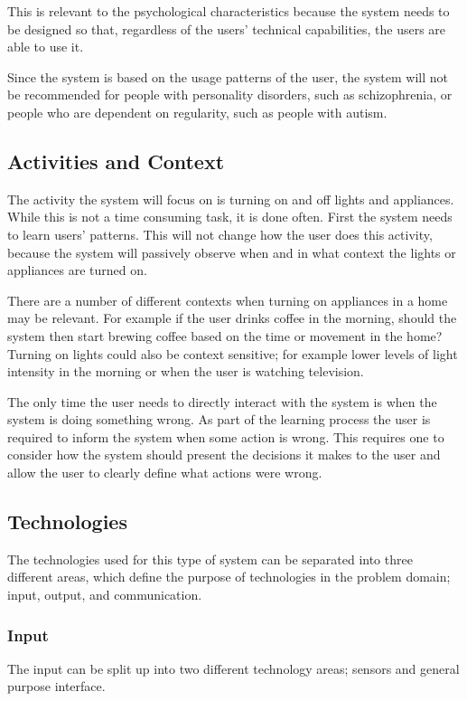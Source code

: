 This is relevant to the psychological characteristics because the system needs to be designed so that, regardless of the users' technical capabilities, the users are able to use it.

Since the system is based on the usage patterns of the user, the system will not be recommended for people with personality disorders, such as schizophrenia, or people who are dependent on regularity, such as people with autism.

\subsection{Activities and Context}
The activity the system will focus on is turning on and off lights and
appliances. While this is not a time consuming task, it is done often. First the
system needs to learn users' patterns. This will not change how the user does
this activity, because the system will passively observe when and in what
context the lights or appliances are turned on.

There are a number of different
contexts when turning on appliances in a home may be relevant.
For example if the user drinks coffee in the morning, should the system then
start brewing coffee based on the time or movement in the home? Turning on
lights could also be context sensitive; for example lower levels of light
intensity in the morning or when the user is watching television.

The only time the user needs to directly interact with the system is when the system is doing something wrong. As part of the learning process the user is required to inform the system when some action is wrong. This requires one to consider how the system should present the decisions it makes to the user and allow the user to clearly define what actions were wrong.

\subsection{Technologies}
\label{sub:Technologies}
The technologies used for this type of system can be separated into three different areas, which define the purpose of technologies in the problem domain; input, output, and communication.
\subsubsection{Input}
The input can be split up into two different technology areas; sensors and general purpose interface.


